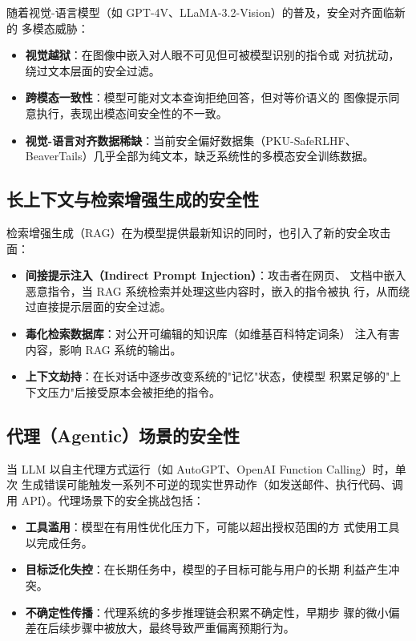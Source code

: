 \documentclass[12pt,a4paper,UTF8]{ctexart}
\begin{document}
随着视觉-语言模型（如 GPT-4V、LLaMA-3.2-Vision）的普及，安全对齐面临新的
多模态威胁：
\begin{itemize}[leftmargin=2em]
  \item \textbf{视觉越狱}：在图像中嵌入对人眼不可见但可被模型识别的指令或
    对抗扰动，绕过文本层面的安全过滤。
  \item \textbf{跨模态一致性}：模型可能对文本查询拒绝回答，但对等价语义的
    图像提示同意执行，表现出模态间安全性的不一致。
  \item \textbf{视觉-语言对齐数据稀缺}：当前安全偏好数据集（PKU-SafeRLHF、
    BeaverTails）几乎全部为纯文本，缺乏系统性的多模态安全训练数据。
\end{itemize}

\subsection{长上下文与检索增强生成的安全性}

检索增强生成（RAG）在为模型提供最新知识的同时，也引入了新的安全攻击面：

\begin{itemize}[leftmargin=2em]
  \item \textbf{间接提示注入（Indirect Prompt Injection）}：攻击者在网页、
    文档中嵌入恶意指令，当 RAG 系统检索并处理这些内容时，嵌入的指令被执
    行，从而绕过直接提示层面的安全过滤。
  \item \textbf{毒化检索数据库}：对公开可编辑的知识库（如维基百科特定词条）
    注入有害内容，影响 RAG 系统的输出。
  \item \textbf{上下文劫持}：在长对话中逐步改变系统的"记忆"状态，使模型
    积累足够的"上下文压力"后接受原本会被拒绝的指令。
\end{itemize}

\subsection{代理（Agentic）场景的安全性}

当 LLM 以自主代理方式运行（如 AutoGPT、OpenAI Function Calling）时，单次
生成错误可能触发一系列不可逆的现实世界动作（如发送邮件、执行代码、调用
API）。代理场景下的安全挑战包括：
\begin{itemize}[leftmargin=2em]
  \item \textbf{工具滥用}：模型在有用性优化压力下，可能以超出授权范围的方
    式使用工具以完成任务。
  \item \textbf{目标泛化失控}：在长期任务中，模型的子目标可能与用户的长期
    利益产生冲突。
  \item \textbf{不确定性传播}：代理系统的多步推理链会积累不确定性，早期步
    骤的微小偏差在后续步骤中被放大，最终导致严重偏离预期行为。
\end{itemize}
\end{document}
